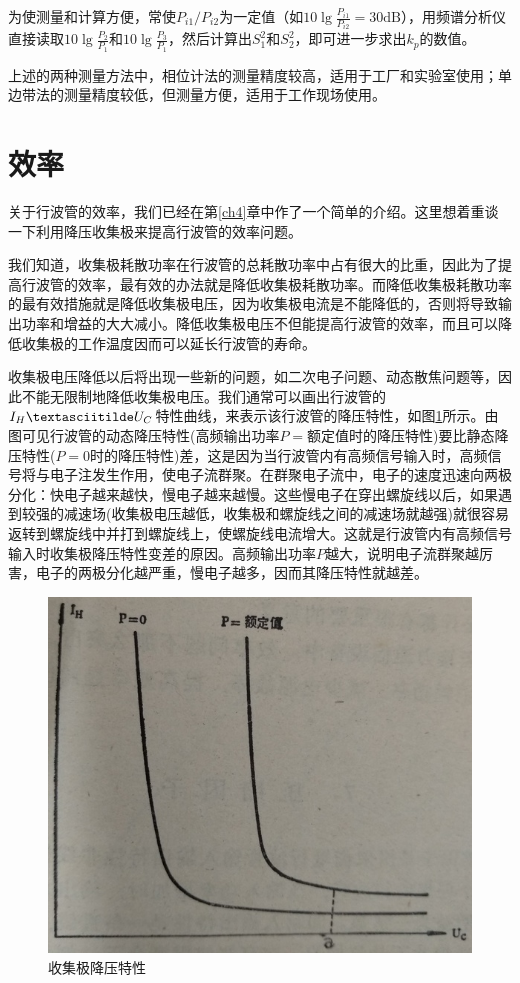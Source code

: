 为使测量和计算方便，常使$ P_{i1}/P_{i2} $为一定值（如$ 10\lg \frac{P_{i1}}{P_{i2}} = 30\textrm{dB} $），用频谱分析仪直接读取$ 10\lg\frac{P_2}{P_1} $和$ 10\lg\frac{P_3}{P_1} $，然后计算出$ S_1^2 $和$ S_2^2 $，即可进一步求出$ k_p $的数值。

上述的两种测量方法中，相位计法的测量精度较高，适用于工厂和实验室使用；单边带法的测量精度较低，但测量方便，适用于工作现场使用。

\section{效率}
关于行波管的效率，我们已经在第\ref{ch4}章中作了一个简单的介绍。这里想着重谈一下利用降压收集极来提高行波管的效率问题。


我们知道，收集极耗散功率在行波管的总耗散功率中占有很大的比重，因此为了提高行波管的效率，最有效的办法就是降低收集极耗散功率。而降低收集极耗散功率的最有效措施就是降低收集极电压，因为收集极电流是不能降低的，否则将导致输出功率和增益的大大减小。降低收集极电压不但能提高行波管的效率，而且可以降低收集极的工作温度因而可以延长行波管的寿命。


收集极电压降低以后将出现一些新的问题，如二次电子问题、动态散焦问题等，因此不能无限制地降低收集极电压。我们通常可以画出行波管的$ I_H\textasciitilde U_C $特性曲线，来表示该行波管的降压特性，如图\ref{ch11-18}所示。由图可见行波管的动态降压特性(高频输出功率$ P= $额定值时的降压特性)要比静态降压特性($ P=0 $时的降压特性)差，这是因为当行波管内有高频信号输入时，高频信号将与电子注发生作用，使电子流群聚。在群聚电子流中，电子的速度迅速向两极分化：快电子越来越快，慢电子越来越慢。这些慢电子在穿出螺旋线以后，如果遇到较强的减速场(收集极电压越低，收集极和螺旋线之间的减速场就越强)就很容易返转到螺旋线中并打到螺旋线上，使螺旋线电流增大。这就是行波管内有高频信号输入时收集极降压特性变差的原因。高频输出功率$ P $越大，说明电子流群聚越厉害，电子的两极分化越严重，慢电子越多，因而其降压特性就越差。

\begin{figure}[phtb]
	\centering
	\includegraphics[width=0.6\linewidth]{figure/ch11-18}
	\caption{收集极降压特性}
	\label{ch11-18}
\end{figure}

